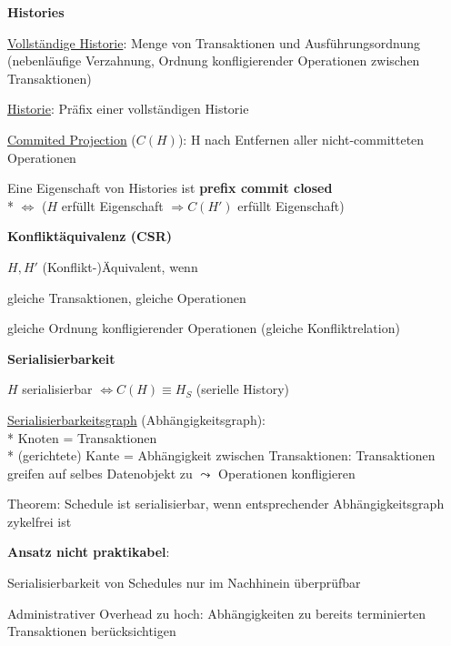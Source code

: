 \textbf{Histories}
\begin{items}
	\item \underline{Vollständige Historie}: Menge von Transaktionen und Ausführungsordnung (nebenläufige Verzahnung, Ordnung konfligierender Operationen zwischen Transaktionen)
	\item \underline{Historie}: Präfix einer vollständigen Historie
	\item \underline{Commited Projection} (\( C(H) \)): H nach Entfernen aller nicht-committeten Operationen
	\item Eine Eigenschaft von Histories ist \textbf{prefix commit closed}
		\\*
		\( \Leftrightarrow \) (\( H \) erfüllt Eigenschaft \( \Rightarrow C(H') \) erfüllt Eigenschaft)
\end{items}

\textbf{Konfliktäquivalenz (CSR)}
\begin{items}
	\item \( H, H' \) (Konflikt-)Äquivalent, wenn
	\begin{enumeration}
		\item gleiche Transaktionen, gleiche Operationen
		\item gleiche Ordnung konfligierender Operationen (gleiche Konfliktrelation)
	\end{enumeration}
\end{items}

\textbf{Serialisierbarkeit}
\begin{items}
	\item \( H \) serialisierbar \( \Leftrightarrow C(H) \equiv H_S \) (serielle History)
	\item \underline{Serialisierbarkeitsgraph} (Abhängigkeitsgraph):
		\\*
		Knoten = Transaktionen
		\\*
		(gerichtete) Kante = Abhängigkeit zwischen Transaktionen: Transaktionen greifen auf selbes Datenobjekt zu \( \leadsto \) Operationen konfligieren
	\item Theorem: Schedule ist serialisierbar, wenn entsprechender Abhängigkeitsgraph zykelfrei ist
	\item \textbf{Ansatz nicht praktikabel}:
	\begin{enumeration}
		\item Serialisierbarkeit von Schedules nur im Nachhinein überprüfbar
		\item Administrativer Overhead zu hoch: Abhängigkeiten zu bereits terminierten Transaktionen berücksichtigen
	\end{enumeration}
\end{items}

